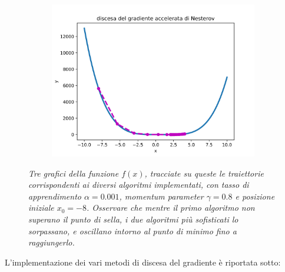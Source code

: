 \documentclass{article}
\begin{document}
\begin{figure}[!htb]
   \begin{subfigure}{.49\textwidth}
    \centering
    \includegraphics[width=1\textwidth]{images/nesterov.png}
\end{subfigure} 
   \caption{\emph{Tre grafici della funzione $f(x)$, tracciate su queste le traiettorie corrispondenti ai diversi algoritmi implementati, con tasso di apprendimento $\alpha = 0.001$, momentum parameter $\gamma = 0.8$ e posizione iniziale $x_0 = -8$.
   Osservare che mentre il primo algoritmo non superano il punto di sella, i due algoritmi più sofisticati lo sorpassano, e oscillano intorno al punto di minimo fino a raggiungerlo.}}
   \label{fig:confronto_algoritmi}
\end{figure}

L'implementazione dei vari metodi di discesa del gradiente è riportata sotto:
\end{document}
